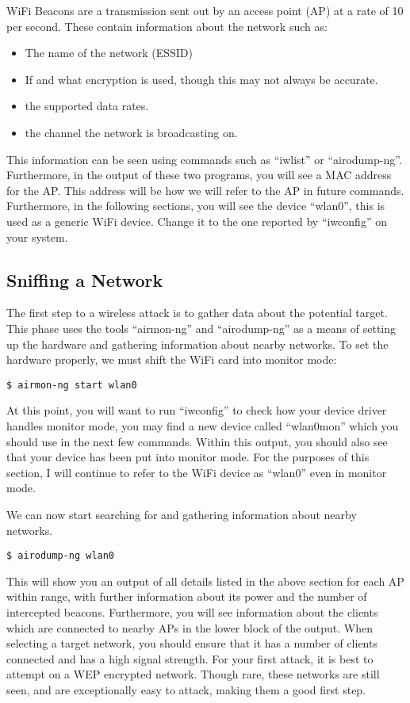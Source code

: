 			WiFi Beacons are a transmission sent out by an access point (AP) at a rate of 10 per second. 
			These contain information about the network such as:
			\begin{itemize}
				\item The name of the network (ESSID)
				\item If and what encryption is used, though this may not always be accurate. 
				\item the supported data rates. 
				\item the channel the network is broadcasting on. 
			\end{itemize}
			This information can be seen using commands such as ``iwlist'' or ``airodump-ng''.
			Furthermore, in the output of these two programs, you will see a MAC address for the AP. 
			This address will be how we will refer to the AP in future commands. 
			Furthermore, in the following sections, you will see the device ``wlan0'', this is used as a generic WiFi device. 
			Change it to the one reported by ``iwconfig'' on your system. 
		\subsection{Sniffing a Network}
			The first step to a wireless attack is to gather data about the potential target. 
			This phase uses the tools ``airmon-ng'' and ``airodump-ng'' as a means of setting up the hardware and gathering information about nearby networks. 
			To set the hardware properly, we must shift the WiFi card into monitor mode:
			\begin{lstlisting}[style=CLI]
				$ airmon-ng start wlan0
			\end{lstlisting}
			At this point, you will want to run ``iwconfig'' to check how your device driver handles monitor mode, you may find a new device called ``wlan0mon'' which you should use in the next few commands. 
			Within this output, you should also see that your device has been put into monitor mode. 
			For the purposes of this section, I will continue to refer to the WiFi device as ``wlan0'' even in monitor mode. 

			We can now start searching for and gathering information about nearby networks. 
			\begin{lstlisting}[style=CLI]
				$ airodump-ng wlan0
			\end{lstlisting}
			This will show you an output of all details listed in the above section for each AP within range, with further information about its power and the number of intercepted beacons. 
			Furthermore, you will see information about the clients which are connected to nearby APs in the lower block of the output. 
			When selecting a target network, you should ensure that it has a number of clients connected and has a high signal strength. 
			For your first attack, it is best to attempt on a WEP encrypted network. 
			Though rare, these networks are still seen, and are exceptionally easy to attack, making them a good first step. 

